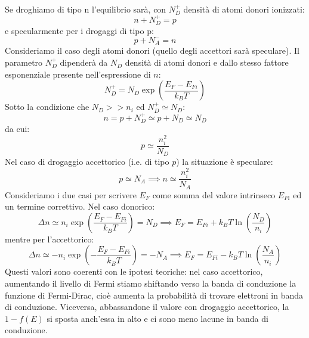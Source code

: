 \documentclass{book}
\begin{document}
        \paragraph{}
            Se droghiamo di tipo n l'equilibrio sarà, con $N_{D} ^{+}$ densità di atomi donori ionizzati:
            $$n+N_{D} ^{+} = p$$
            e specularmente per i drogaggi di tipo p:
            $$p +N_{A} ^{-} = n$$
            Consideriamo il caso degli atomi donori (quello degli accettori sarà speculare). Il parametro $N_{D} ^{+}$ dipenderà da $N_{D}$ densità di atomi donori e dallo stesso fattore esponenziale presente nell'espressione di $n$:
            $$N_{D} ^{+} = N_{D}\exp{(\frac{E_{F}-E_{Fi}}{k_{B}T})}$$
            Sotto la condizione che $N_{D} >> n_{i}$ ed $N_{D} ^{+} \simeq N_{D}$:
            $$n = p + N_{D} ^{+} \simeq p + N_{D} \simeq N_{D}$$
            da cui:
            $$p \simeq \frac{n_{i} ^{2}}{N_{D}}$$
            Nel caso di drogaggio accettorico (i.e. di tipo $p$) la situazione è speculare:
            $$p \simeq N_{A} \implies n \simeq \frac{n_{i} ^{2}}{N_{A}}$$
            Consideriamo i due casi per scrivere $E_{F}$ come somma del valore intrinseco $E_{Fi}$ ed un termine correttivo. Nel caso donorico:
            $$\Delta n \simeq n_{i}\exp{(\frac{E_{F}-E_{Fi}}{k_{B}T})} = N_{D} \implies E_{F} = E_{Fi} + k_{B}T\ln{(\frac{N_{D}}{n_{i}})}$$
            mentre per l'accettorico:
            $$\Delta n \simeq -n_{i}\exp{(-\frac{E_{F}-E_{Fi}}{k_{B}T})} = -N_{A} \implies E_{F} = E_{Fi} - k_{B}T\ln{(\frac{N_{A}}{n_{i}})}$$
            Questi valori sono coerenti con le ipotesi teoriche: nel caso accettorico, aumentando il livello di Fermi stiamo shiftando verso la banda di conduzione la funzione di Fermi-Dirac, cioè aumenta la probabilità di trovare elettroni in banda di conduzione. Viceversa, abbassandone il valore con drogaggio accettorico, la $1-f(E)$ si sposta anch'essa in alto e ci sono meno lacune in banda di conduzione.
\end{document}
